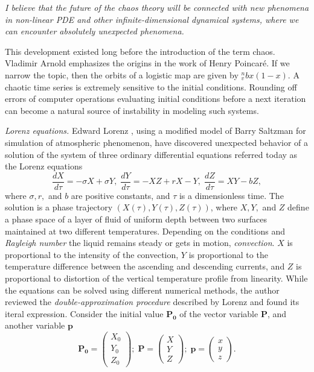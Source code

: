 \documentclass{article}
\begin{document}
\textit{I believe that the future of the chaos theory will be connected with new phenomena in non-linear PDE and other infinite-dimensional dynamical systems, where we can encounter absolutely unexpected phenomena.}

This development existed long before the introduction of the term chaos. Vladimir Arnold \cite{arnold} emphasizes the origins in the work of Henry Poincar\'{e}. If we narrow the topic, then the orbits of a logistic map are given by \CYRI$_{v}^{n}bx(1-x)$. A chaotic time series is extremely sensitive to the initial conditions. Rounding off errors of computer operations evaluating initial conditions before a next iteration can become a natural source of instability in modeling such systems.

\textit{Lorenz equations.} Edward Lorenz \cite{lorenz}, using a modified model of Barry Saltzman \cite{saltzman} for simulation of atmospheric phenomenon, have discovered unexpected behavior of a solution of the system of three ordinary differential equations referred today as the Lorenz equations
\begin{displaymath}
\frac{dX}{d\tau} = -\sigma X + \sigma Y, \; \frac{dY}{d\tau} = -XZ + rX - Y, \; \frac{dZ}{d\tau} = XY - bZ,
\end{displaymath}
where $\sigma, r,$ and $b$ are positive constants, and $\tau$ is a dimensionless time. The solution is a phase trajectory $(X(\tau), Y(\tau), Z(\tau))$, where $X, Y,$ and $Z$ define a phase space of a layer of fluid of uniform depth between two surfaces maintained at two different temperatures. Depending on the conditions and \textit{Rayleigh number} the liquid remains steady or gets in motion, \textit{convection}. $X$ is proportional to the intensity of the convection, $Y$ is proportional to the temperature difference between the ascending and descending currents, and $Z$ is proportional to distortion of the vertical temperature profile from linearity. While the equations can be solved using different numerical methods, the author reviewed the \textit{double-approximation procedure} described by Lorenz and found its iteral expression. Consider the initial value $\boldsymbol{P_0}$ of the vector variable $\boldsymbol{P}$, and another variable $\boldsymbol{p}$
\begin{displaymath}
\boldsymbol{P_0} =
\left(
\begin{array}{r}
X_0\\
Y_0\\
Z_0
\end{array}
\right); \;
\boldsymbol{P} =
\left(
\begin{array}{r}
X\\
Y\\
Z
\end{array}
\right); \;
\boldsymbol{p} =
\left(
\begin{array}{r}
x\\
y\\
z
\end{array}
\right).
\end{displaymath}
\end{document}
